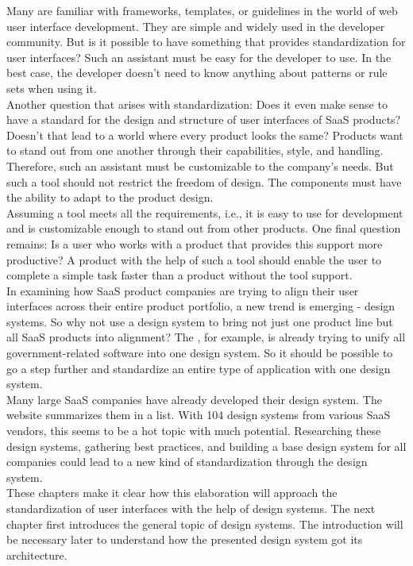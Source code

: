 Many are familiar with frameworks, templates, or guidelines in the world of web user interface development. They are simple and widely used in the developer community. But is it possible to have something that provides standardization for user interfaces? Such an assistant must be easy for the developer to use. In the best case, the developer doesn't need to know anything about patterns or rule sets when using it. \\
Another question that arises with standardization: Does it even make sense to have a standard for the design and structure of user interfaces of \ac{SaaS} products? Doesn't that lead to a world where every product looks the same? Products want to stand out from one another through their capabilities, style, and handling. Therefore, such an assistant must be customizable to the company's needs. But such a tool should not restrict the freedom of design. The components must have the ability to adapt to the product design. \\
Assuming a tool meets all the requirements, i.e., it is easy to use for development and is customizable enough to stand out from other products. One final question remains: Is a user who works with a product that provides this support more productive? A product with the help of such a tool should enable the user to complete a simple task faster than a product without the tool support. \\
In examining how \ac{SaaS} product companies are trying to align their user interfaces across their entire product portfolio, a new trend is emerging - design systems. So why not use a design system to bring not just one product line but all \ac{SaaS} products into alignment? The , for example, is already trying to unify all government-related software into one design system. So it should be possible to go a step further and standardize an entire type of application with one design system. \\
Many large \ac{SaaS} companies have already developed their design system. The  website summarizes them in a list. With 104 design systems from various \ac{SaaS} vendors, this seems to be a hot topic with much potential. Researching these design systems, gathering best practices, and building a base design system for all companies could lead to a new kind of standardization through the design system. \\

These chapters make it clear how this elaboration will approach the standardization of user interfaces with the help of design systems. The next chapter first introduces the general topic of design systems. The introduction will be necessary later to understand how the presented design system got its architecture. 